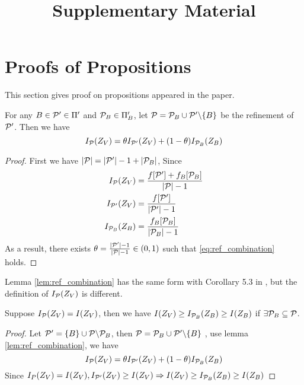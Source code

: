 \documentclass{article}
\title{Supplementary Material}
\begin{document}
\maketitle
\appendix
\section{Proofs of Propositions}
This section gives proof on propositions appeared in the paper.

\begin{lemma}\label{lem:ref_combination}
For any $B \in \P' \in \Pi'$ and $\P_B \in \Pi'_B$, let $\P = \P_B \cup \P' \backslash \{B\} $
be the refinement of $\P'$. Then we have
\begin{equation}\label{eq:ref_combination}
I_{\P}(Z_V) = \theta I_{\P'}(Z_V) + (1-\theta) I_{\P_B}(Z_B)
\end{equation}
\end{lemma}
\begin{proof}
	First we have $\abs{\P} = \abs{\P'} -1 + \abs{\P_B}$,
	Since
	\begin{align*}
		I_{\P}(Z_V) & = { f[\P'] + f_B[\P_B] \over \abs{\P} - 1} \\
		I_{\P'}(Z_V) & = { f[\P'] \over \abs{\P'} - 1} \\
		I_{\P_B}(Z_B) & = { f_B[\P_B] \over \abs{\P_B} - 1}
	\end{align*}
	As a result, there exists $\theta = {\abs{\P'} - 1 \over \abs{\P} - 1} \in (0,1)$ such that 
	\eqref{eq:ref_combination} holds.
\end{proof}
Lemma \ref{lem:ref_combination} has the same form with Corollary 5.3 in \cite{secretKey}, but the definition of $I_{\P}(Z_V)$ is different.

\begin{lemma}\label{lem:smallZB}
Suppose $I_{\P}(Z_V) = I(Z_V)$, then we have $I(Z_V) \geq I_{\P_B}(Z_B) \geq I(Z_B)$ if $\exists \P_B \subseteq \P$.
\end{lemma}
\begin{proof}
Let $\P' = \{B\} \cup \P\backslash \P_B$, then $\P = \P_B \cup \P'\backslash\{B\}$ , use lemma \ref{lem:ref_combination}, we have
\begin{equation}
I_{\P}(Z_V) = \theta I_{\P'}(Z_V) + (1-\theta) I_{\P_B}(Z_B)
\end{equation}
Since  $I_{P}(Z_V) = I(Z_V), I_{\P'}(Z_V)\geq I(Z_V) \Rightarrow I(Z_V) \geq I_{\P_B}(Z_B) \geq I(Z_B)$ 
\end{proof}
\end{document}
